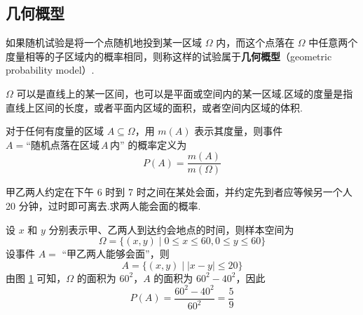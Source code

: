 \subsection{几何概型}

如果随机试验是将一个点随机地投到某一区域 $\varOmega$ 内，而这个点落在 $\varOmega$ 中任意两个度量相等的子区域内的概率相同，则称这样的试验属于\textbf{几何概型}（geometric probability model）.

\begin{note}
    \indent $\varOmega$ 可以是直线上的某一区间，也可以是平面或空间内的某一区域.区域的度量是指直线上区间的长度，或者平面内区域的面积，或者空间内区域的体积.
\end{note}

对于任何有度量的区域 $A \subseteq \varOmega$，用 $m(A)$ 表示其度量，则事件 $A = \text{“随机点落在区域}\, A \,\text{内”}$ 的概率定义为
$$
P(A)=\dfrac{m(A)}{m(\varOmega)}
$$

\begin{example}[][会面问题]
    \indent 甲乙两人约定在下午 6 时到 7 时之间在某处会面，并约定先到者应等候另一个人 20 分钟，过时即可离去.求两人能会面的概率.
\end{example}

\begin{solution}
    设 $x$ 和 $y$ 分别表示甲、乙两人到达约会地点的时间，则样本空间为
    $$
    \varOmega = \{ (x,y) \mid 0 \leqslant x \leqslant 60, 0 \leqslant y \leqslant 60 \}
    $$
    设事件 $A=$ “甲乙两人能够会面”，则
    $$
    A = \{ (x,y) \mid |x-y| \leqslant 20 \}
    $$
    由图 \ref{fig:会面问题} 可知，$\varOmega$ 的面积为 $60^2$，$A$ 的面积为 $60^2 - 40^2$，因此
    $$
    P(A) = \dfrac{60^2 - 40^2}{60^2} = \dfrac{5}{9}
    $$

    \begin{figure}[H]
        \centering


        \vspace{-0.8em}

        \caption{}
        \label{fig:会面问题}
    \end{figure}
\end{solution}

